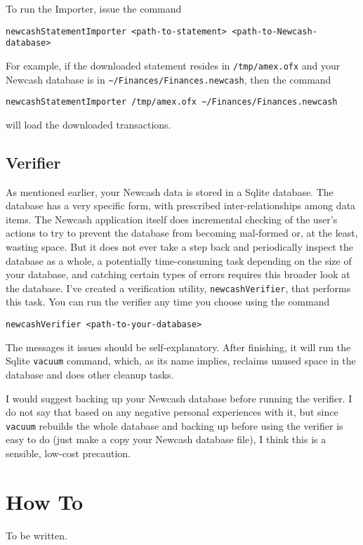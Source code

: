 \documentclass{report}
\begin{document}
To run the Importer, issue the command
\begin{verbatim}
newcashStatementImporter <path-to-statement> <path-to-Newcash-database>
\end{verbatim}

For example, if the downloaded statement resides in \verb|/tmp/amex.ofx| and your Newcash database is in \verb|~/Finances/Finances.newcash|, then the command
\begin{verbatim}
newcashStatementImporter /tmp/amex.ofx ~/Finances/Finances.newcash
\end{verbatim}
will load the downloaded transactions.

\subsection{Verifier}
As mentioned earlier, your Newcash data is stored in a Sqlite database. The database has a very specific form,  with prescribed inter-relationships among data items. The Newcash application itself does incremental checking of the user's actions
to try to prevent the database from becoming mal-formed or, at the least, wasting space. But it does not ever take a step back and periodically inspect the database as a whole, a potentially time-consuming task depending on the size of your database, and  catching certain types of errors requires this broader look at the database. I've created a verification utility, \verb|newcashVerifier|, that performs this task. You can run the verifier any time you choose using the command
\begin{verbatim}
newcashVerifier <path-to-your-database>
\end{verbatim}
The messages it issues should be self-explanatory. After finishing, it will run the Sqlite \verb|vacuum| command, which, as its name implies, reclaims unused space in the database and does other cleanup tasks.

I would suggest backing up your Newcash database before running the verifier. I do not say that based on any negative personal experiences with it, but since \verb|vacuum| rebuilds the whole database and backing up before using the verifier is easy to do (just make a copy your Newcash database file), I think this is a sensible, low-cost precaution.
 
\section{How To}
\label{How To}
To be written.
\end{document}
